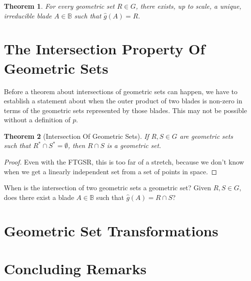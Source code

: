 \documentclass{birkjour}
\newtheorem{thm}{Theorem}[section]
\theoremstyle{definition}
\theoremstyle{remark}
\numberwithin{equation}{section}
\newcommand{\B}{\mathbb{B}}
\newcommand{\gh}{\hat{g}}
\begin{document}
\begin{thm}
For every geometric set $R\in G$, there exists, up to scale, a unique, irreducible blade $A\in\B$ such that
$\gh(A)=R$.
\end{thm}

\section{The Intersection Property Of Geometric Sets}

Before a theorem about intersections of geometric sets can happen, we have to establish a statement
about when the outer product of two blades is non-zero in terms of the geometric sets represented by
those blades.  This may not be possible without a definition of $p$.

\begin{thm}[Intersection Of Geometric Sets]
If $R,S\in G$ are geometric sets such that $R^*\cap S^*=\emptyset$,
then $R\cap S$ is a geometric set.
\end{thm}
\begin{proof}
Even with the FTGSR, this is too far of a stretch, because we don't know when we get a linearly
independent set from a set of points in space.
\end{proof}

When is the intersection of two geometric sets a geometric set?  Given $R,S\in G$, does there
exist a blade $A\in\B$ such that $\gh(A)=R\cap S$?



\section{Geometric Set Transformations}



\section{Concluding Remarks}
\end{document}

